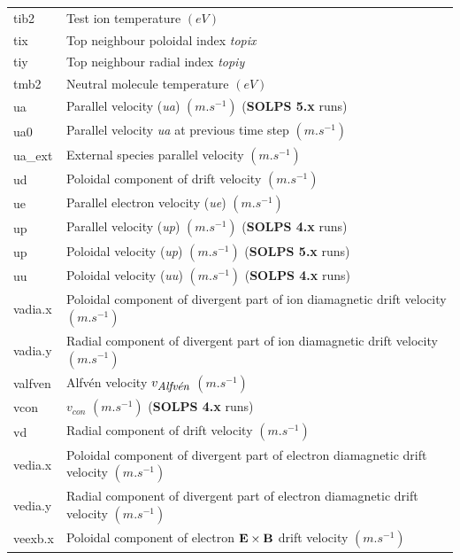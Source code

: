 \documentclass[a4paper,10pt]{report}
\newcommand\SOLPSfour{{\bf SOLPS 4.x} }
\newcommand\SOLPSfive{{\bf SOLPS 5.x} }
\begin{document}
\begin{center}
\begin{longtable}{|l|l|}
    tib2     & \index{b2plot, tib2} Test ion temperature $(eV)$ \\
    tix      & \index{b2plot, tix} Top neighbour poloidal index {\em topix} \\
    tiy      & \index{b2plot, tiy} Top neighbour radial index {\em topiy} \\
    tmb2     & \index{b2plot, tmb2} Neutral molecule temperature $(eV)$ \\
    ua       & \index{b2plot, ua} Parallel velocity ({\em ua}) $(m.s^{-1})$ (\SOLPSfive runs) \\
    ua0      & \index{b2plot, ua0} Parallel velocity {\em ua} at previous time step $(m.s^{-1})$ \\
    ua\_ext  & \index{b2plot, ua\_ext} External species parallel velocity $(m.s^{-1})$ \\
    ud       & \index{b2plot, ud} Poloidal component of drift velocity $(m.s^{-1})$ \\
    ue       & \index{b2plot, ue} Parallel electron velocity ({\em ue}) $(m.s^{-1})$ \\
    up       & \index{b2plot, up} Parallel velocity ({\em up}) $(m.s^{-1})$ (\SOLPSfour runs) \\
    up       & \index{b2plot, up} Poloidal velocity ({\em up}) $(m.s^{-1})$ (\SOLPSfive runs) \\
    uu       & \index{b2plot, uu} Poloidal velocity ({\em uu}) $(m.s^{-1})$ (\SOLPSfour runs) \\
    vadia.x  & \index{b2plot, vadia.x} Poloidal component of divergent part of ion diamagnetic drift velocity $(m.s^{-1})$ \\
    vadia.y  & \index{b2plot, vadia.y} Radial component of divergent part of ion diamagnetic drift velocity $(m.s^{-1})$ \\
    valfven  & \index{b2plot, valfven} Alfv{\'e}n velocity $v_{\mbox{\small{\it Alfv{\'e}n}}}$ $(m.s^{-1})$ \\
    vcon     & \index{b2plot, vcon} $v_{con}$ $(m.s^{-1})$ (\SOLPSfour runs) \\
    vd       & \index{b2plot, vd} Radial component of drift velocity $(m.s^{-1})$ \\
    vedia.x  & \index{b2plot, vedia.x} Poloidal component of divergent part of electron diamagnetic drift velocity $(m.s^{-1})$ \\
    vedia.y  & \index{b2plot, vedia.y} Radial component of divergent part of electron diamagnetic drift velocity $(m.s^{-1})$ \\
    veexb.x  & \index{b2plot, veexb.x} Poloidal component of electron ${\bf E} \times {\bf B}$ drift velocity $(m.s^{-1})$ \\

\end{longtable}
\end{center}
\end{document}
